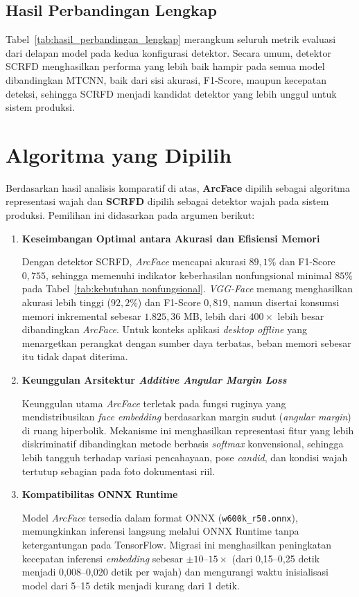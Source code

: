 \subsection{Hasil Perbandingan Lengkap}



Tabel~\ref{tab:hasil_perbandingan_lengkap} merangkum seluruh metrik evaluasi dari delapan model pada kedua konfigurasi detektor. Secara umum, detektor SCRFD menghasilkan performa yang lebih baik hampir pada semua model dibandingkan MTCNN, baik dari sisi akurasi, F1-Score, maupun kecepatan deteksi, sehingga SCRFD menjadi kandidat detektor yang lebih unggul untuk sistem produksi.

\section{Algoritma yang Dipilih}

Berdasarkan hasil analisis komparatif di atas, \textbf{ArcFace} dipilih sebagai algoritma representasi wajah dan \textbf{SCRFD} dipilih sebagai detektor wajah pada sistem produksi. Pemilihan ini didasarkan pada argumen berikut:

\begin{enumerate}
    \item \textbf{Keseimbangan Optimal antara Akurasi dan Efisiensi Memori}

    Dengan detektor SCRFD, \textit{ArcFace} mencapai akurasi $89{,}1\%$ dan F1-Score $0{,}755$, sehingga memenuhi indikator keberhasilan nonfungsional minimal $85\%$ pada Tabel~\ref{tab:kebutuhan nonfungsional}. \textit{VGG-Face} memang menghasilkan akurasi lebih tinggi ($92{,}2\%$) dan F1-Score $0{,}819$, namun disertai konsumsi memori inkremental sebesar $1.825{,}36$ MB, lebih dari $400\times$ lebih besar dibandingkan \textit{ArcFace}. Untuk konteks aplikasi \textit{desktop offline} yang menargetkan perangkat dengan sumber daya terbatas, beban memori sebesar itu tidak dapat diterima.

    \item \textbf{Keunggulan Arsitektur \textit{Additive Angular Margin Loss}}

    Keunggulan utama \textit{ArcFace} terletak pada fungsi ruginya yang mendistribusikan \textit{face embedding} berdasarkan margin sudut (\textit{angular margin}) di ruang hiperbolik. Mekanisme ini menghasilkan representasi fitur yang lebih diskriminatif dibandingkan metode berbasis \textit{softmax} konvensional, sehingga lebih tangguh terhadap variasi pencahayaan, pose \textit{candid}, dan kondisi wajah tertutup sebagian pada foto dokumentasi riil.

    \item \textbf{Kompatibilitas ONNX Runtime}

    Model \textit{ArcFace} tersedia dalam format ONNX (\texttt{w600k\_r50.onnx}), memungkinkan inferensi langsung melalui ONNX Runtime tanpa ketergantungan pada TensorFlow. Migrasi ini menghasilkan peningkatan kecepatan inferensi \textit{embedding} sebesar $\pm 10$–$15\times$ (dari 0,15–0,25 detik menjadi 0,008–0,020 detik per wajah) dan mengurangi waktu inisialisasi model dari 5–15 detik menjadi kurang dari 1 detik.
\end{enumerate}

